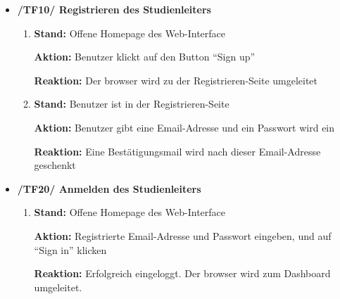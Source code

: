 \documentclass[a4paper]{scrreprt}
\begin{document}
            \begin{itemize}
                \item \textbf{/TF10/ Registrieren des \gls{Studienleiter}s}
                    \begin{enumerate}
                        \item \par \textbf{Stand: }Offene Homepage des \gls{Web-Interface}
                            \par \textbf{Aktion: }Benutzer klickt auf den Button ``Sign up''
                            \par \textbf{Reaktion: }Der browser wird zu der Registrieren-Seite umgeleitet
                        \item \par \textbf{Stand: }Benutzer ist in der Registrieren-Seite
                             \par \textbf{Aktion: }Benutzer gibt eine Email-Adresse und ein Passwort wird ein
                             \par \textbf{Reaktion: }Eine Bestätigungsmail wird nach dieser Email-Adresse geschenkt
                   \end{enumerate}

                    \item \textbf{/TF20/ Anmelden des \gls{Studienleiter}s}
                        \begin{enumerate}
                            \item \par \textbf{Stand: }Offene Homepage des \gls{Web-Interface}
                                \par \textbf{Aktion: }Registrierte Email-Adresse und Passwort eingeben, und auf “Sign in” klicken
                                \par \textbf{Reaktion: }Erfolgreich eingeloggt. Der browser wird zum Dashboard umgeleitet.
                        \end{enumerate}


\end{itemize}
\end{document}
